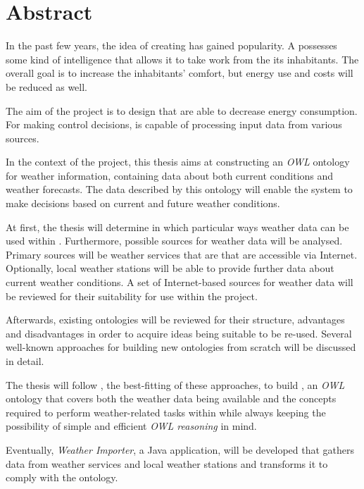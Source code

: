 \chapter*{Abstract}

In the past few years, the idea of creating \smarthomes has gained popularity. A \smarthome possesses some kind of intelligence that allows it to take work from the its inhabitants. The overall goal is to increase the inhabitants' comfort, but energy use and costs will be reduced as well.

The aim of the \thinkhome project is to design \smarthomes that are able to decrease energy consumption. For making control decisions, \thinkhome is capable of processing input data from various sources.

In the context of the \thinkhome project, this thesis aims at constructing an \emph{OWL} ontology for weather information, containing data about both current conditions and weather forecasts. The data described by this ontology will enable the \thinkhome system to make decisions based on current and future weather conditions.

At first, the thesis will determine in which particular ways weather data can be used within \thinkhome. Furthermore, possible sources for weather data will be analysed. Primary sources will be weather services that are that are accessible via Internet. Optionally, local weather stations will be able to provide further data about current weather conditions. A set of Internet-based sources for weather data will be reviewed for their suitability for use within the \thinkhome project.

Afterwards, existing ontologies will be reviewed for their structure, advantages and disadvantages in order to acquire ideas being suitable to be re-used. Several well-known approaches for building new ontologies from scratch will be discussed in detail.

The thesis will follow \methontology, the best-fitting of these approaches, to build \smarthomeweather, an \textit{OWL} ontology that covers both the weather data being available and the concepts required to perform weather-related tasks within \thinkhome while always keeping the possibility of simple and efficient \textit{OWL reasoning} in mind.

Eventually, \emph{Weather Importer}, a Java application, will be developed that gathers data from weather services and local weather stations and transforms it to comply with the \smarthomeweather ontology.
